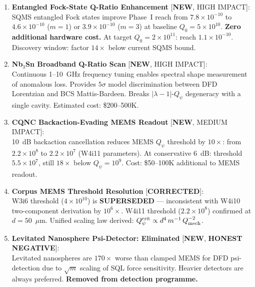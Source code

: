 \documentclass[11pt]{article}
\newcommand{\lam}{\lambda}
\newcommand{\ee}[1]{\times 10^{#1}}
\newcommand{\Qpsi}{Q_\psi}
\newcommand{\lbone}{|\lam - 1|}
\theoremstyle{definition}
\theoremstyle{remark}
\begin{document}
\begin{tcolorbox}[colback=green!5!white, colframe=green!50!black,
  title=\textbf{W4i13 FINDINGS RANKED BY PROGRAMME IMPACT}]

\begin{enumerate}

\item \textbf{Entangled Fock-State Q-Ratio Enhancement}
  [\textbf{NEW}, HIGH IMPACT]:\\
  SQMS entangled Fock states improve Phase~I reach from $7.8\ee{-10}$
  to $4.6\ee{-10}$ ($m=1$) or $3.9\ee{-10}$ ($m=3$) at baseline
  $Q_0 = 5\ee{10}$. \textbf{Zero additional hardware cost.}
  At target $Q_0 = 2\ee{11}$: reach $1.1\ee{-10}$.
  Discovery window: factor $14\times$ below current SQMS bound.

\item \textbf{Nb$_3$Sn Broadband Q-Ratio Scan}
  [\textbf{NEW}, HIGH IMPACT]:\\
  Continuous 1--10~GHz frequency tuning enables spectral shape
  measurement of anomalous loss. Provides $5\sigma$ model discrimination
  between DFD Lorentzian and BCS Mattis-Bardeen. Breaks $\lbone$-$\Qpsi$
  degeneracy with a single cavity. Estimated cost: \$200--500K.

\item \textbf{CQNC Backaction-Evading MEMS Readout}
  [\textbf{NEW}, MEDIUM IMPACT]:\\
  10~dB backaction cancellation reduces MEMS $\Qpsi$ threshold by
  $10\times$: from $2.2\ee{8}$ to $2.2\ee{7}$ (W4i11 parameters).
  At conservative 6~dB: threshold $5.5\ee{7}$, still $18\times$ below
  $\Qpsi = 10^9$. Cost: \$50--100K additional to MEMS readout.

\item \textbf{Corpus MEMS Threshold Resolution}
  [\textbf{CORRECTED}]:\\
  W3i6 threshold ($4\ee{10}$) is \textbf{SUPERSEDED} --- inconsistent
  with W4i10 two-component derivation by $10^6\times$. W4i11 threshold
  ($2.2\ee{8}$) confirmed at $d = 50$~$\mu$m. Unified scaling law
  derived: $\Qpsi^{\rm crit} \propto d^4\,m^{-1}\,Q_{\rm mech}^{-2}$.

\item \textbf{Levitated Nanosphere Psi-Detector: Eliminated}
  [\textbf{NEW}, \textbf{HONEST NEGATIVE}]:\\
  Levitated nanospheres are $170\times$ worse than clamped MEMS for
  DFD psi-detection due to $\sqrt{m}$ scaling of SQL force sensitivity.
  Heavier detectors are always preferred. \textbf{Removed from detection
  programme.}

\end{enumerate}
\end{tcolorbox}
\end{document}
